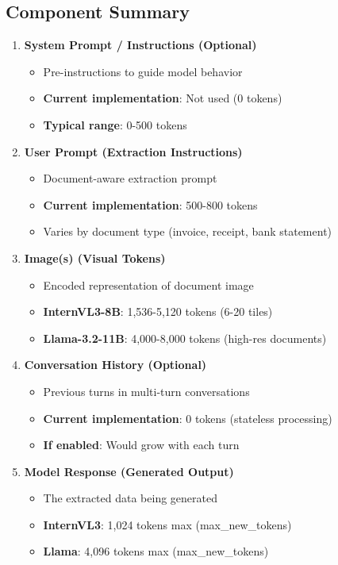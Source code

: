 \documentclass[11pt,a4paper]{article}
\begin{document}
\subsection{Component Summary}

\begin{enumerate}[leftmargin=*]
    \item \textbf{System Prompt / Instructions (Optional)}
    \begin{itemize}
        \item Pre-instructions to guide model behavior
        \item \textbf{Current implementation}: Not used (0 tokens)
        \item \textbf{Typical range}: 0-500 tokens
    \end{itemize}

    \item \textbf{User Prompt (Extraction Instructions)}
    \begin{itemize}
        \item Document-aware extraction prompt
        \item \textbf{Current implementation}: 500-800 tokens
        \item Varies by document type (invoice, receipt, bank statement)
    \end{itemize}

    \item \textbf{Image(s) (Visual Tokens)}
    \begin{itemize}
        \item Encoded representation of document image
        \item \textbf{InternVL3-8B}: 1,536-5,120 tokens (6-20 tiles)
        \item \textbf{Llama-3.2-11B}: 4,000-8,000 tokens (high-res documents)
    \end{itemize}

    \item \textbf{Conversation History (Optional)}
    \begin{itemize}
        \item Previous turns in multi-turn conversations
        \item \textbf{Current implementation}: 0 tokens (stateless processing)
        \item \textbf{If enabled}: Would grow with each turn
    \end{itemize}

    \item \textbf{Model Response (Generated Output)}
    \begin{itemize}
        \item The extracted data being generated
        \item \textbf{InternVL3}: 1,024 tokens max (max\_new\_tokens)
        \item \textbf{Llama}: 4,096 tokens max (max\_new\_tokens)
    \end{itemize}
\end{enumerate}
\end{document}
